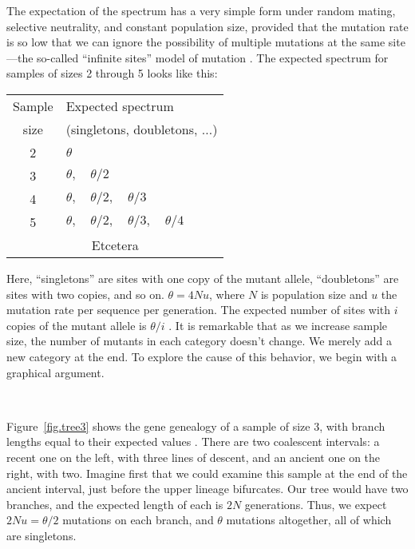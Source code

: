 \documentclass[12pt,twocolumn]{article}
\begin{document}
The expectation of the spectrum has a very simple form under random
mating, selective neutrality, and constant population size, provided
that the mutation rate is so low that we can ignore the possibility of
multiple mutations at the same site---the so-called ``infinite sites''
model of mutation \citep{Kimura:InfiniteSites}. The expected spectrum
for samples of sizes 2 through 5 looks like this:
\begin{center}
  \begin{tabular}{cl}
Sample & Expected spectrum\\
size   & (singletons, doubletons, $\ldots$)\\ \hline
2 & $\theta$\\
3 & $\theta, \quad \theta/2$\\
4 & $\theta, \quad \theta/2, \quad \theta/3$\\
5 & $\theta, \quad \theta/2, \quad \theta/3, \quad \theta/4$\\
\multicolumn{2}{c}{Etcetera}
\end{tabular}
\end{center}
Here, ``singletons'' are sites with one copy of the mutant allele,
``doubletons'' are sites with two copies, and so on. $\theta=4Nu$,
where $N$ is population size and $u$ the mutation rate per sequence
per generation. The expected number of sites with $i$ copies of the
mutant allele is $\theta/i$ \citep[Eqn.~22]{Fu:TPB-48-172}. It is
remarkable that as we increase sample size, the number of mutants in
each category doesn't change.  We merely add a new category at the
end. To explore the cause of this behavior, we begin with a graphical
argument.

\begin{figure*}
  {\centering\\}
  \caption{Gene genealogy of a sample of size 3, with the expected
    length in generations of each coalescent interval.}
  \label{fig.tree3}
\end{figure*}

Figure~\ref{fig.tree3} shows the gene genealogy of a sample of size 3,
with branch lengths equal to their expected values
\citep{Hudson:OSE-7-1}. There are two coalescent intervals: a recent
one on the left, with three lines of descent, and an ancient one on
the right, with two. Imagine first that we could examine this sample
at the end of the ancient interval, just before the upper lineage
bifurcates. Our tree would have two branches, and the expected length
of each is $2N$ generations. Thus, we expect $2Nu = \theta/2$
mutations on each branch, and $\theta$ mutations altogether, all of
which are singletons.
\end{document}
